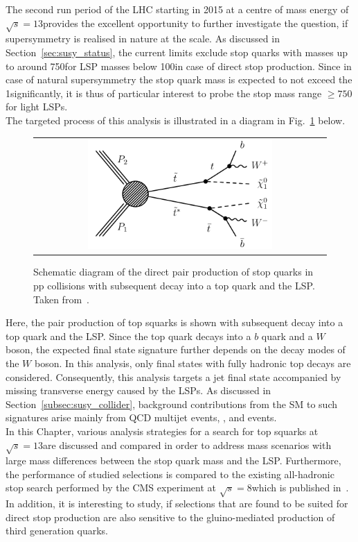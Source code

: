 The second run period of the LHC starting in 2015 at a centre of mass energy of $\sqrt{s} = 13$\tev provides the excellent opportunity to further investigate the question, if supersymmetry is realised in nature at the \tev scale. As discussed in Section~\ref{sec:susy_status}, the current limits exclude stop quarks with masses up to around 750\gev for LSP masses below 100\gev in case of direct stop production. Since in case of natural supersymmetry the stop quark mass is expected to not exceed the 1\tev significantly, it is thus of particular interest to probe the stop mass range $\ge 750$\gev for light LSPs. \\
The targeted process of this analysis is illustrated in a diagram in Fig.~\ref{fig:T2tt} below. \\ 
\begin{figure}[!h]
  \centering
  \begin{tabular}{c}
                \includegraphics[width=0.65\textwidth]{figures/T2tt.pdf} 
  \end{tabular}
  \caption{Schematic diagram of the direct pair production of stop quarks in pp collisions with subsequent decay into a top quark and the LSP. Taken from~\cite{bib:CMS:PhysicsResultsSUS}. }
  \label{fig:T2tt}
\end{figure}
   
Here, the pair production of top squarks is shown with subsequent decay into a top quark and the LSP. Since the top quark decays into a $b$ quark and a $W$ boson, the expected final state signature further depends on the decay modes of the $W$ boson. In this analysis, only final states with fully hadronic top decays are considered. Consequently, this analysis targets a jet final state accompanied by missing transverse energy caused by the LSPs. As discussed in Section~\ref{subsec:susy_collider}, background contributions from the SM to such signatures arise mainly from QCD multijet events, \WJets, \ZJets and \ttbar events. \\
In this Chapter, various analysis strategies for a search for top squarks at $\sqrt{s} = 13$\tev are discussed and compared in order to address mass scenarios with large mass differences between the stop quark mass and the LSP. Furthermore, the performance of studied selections is compared to the existing all-hadronic stop search performed by the CMS experiment at $\sqrt{s} = 8$\tev which is published in~\cite{CMS-PAS-SUS-13-015}. In addition, it is interesting to study, if selections that are found to be suited for direct stop production are also sensitive to the gluino-mediated production of third generation quarks. \\

